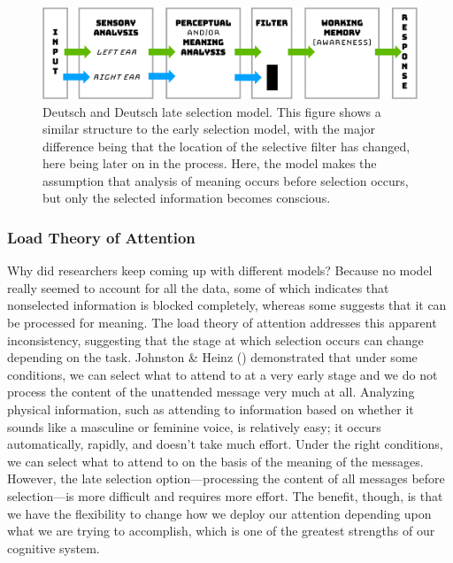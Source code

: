 \documentclass[
]{krantz}
\begin{document}
\begin{figure}

{\centering \includegraphics[width=0.8\linewidth]{images/3_attention/lateselection} 

}

\caption{Deutsch and Deutsch late selection model. This figure shows a similar structure to the early selection model, with the major difference being that the location of the selective filter has changed, here being later on in the process. Here, the model makes the assumption that analysis of meaning occurs before selection occurs, but only the selected information becomes conscious.}\label{fig:lateselection}
\end{figure}

\subsubsection*{Load Theory of Attention}\label{load-theory-of-attention}


Why did researchers keep coming up with different models? Because no model really seemed to account for all the data, some of which indicates that nonselected information is blocked completely, whereas some suggests that it can be processed for meaning. The load theory of attention addresses this apparent inconsistency, suggesting that the stage at which selection occurs can change depending on the task. Johnston \& Heinz () demonstrated that under some conditions, we can select what to attend to at a very early stage and we do not process the content of the unattended message very much at all. Analyzing physical information, such as attending to information based on whether it sounds like a masculine or feminine voice, is relatively easy; it occurs automatically, rapidly, and doesn't take much effort. Under the right conditions, we can select what to attend to on the basis of the meaning of the messages. However, the late selection option---processing the content of all messages before selection---is more difficult and requires more effort. The benefit, though, is that we have the flexibility to change how we deploy our attention depending upon what we are trying to accomplish, which is one of the greatest strengths of our cognitive system.
\end{document}
